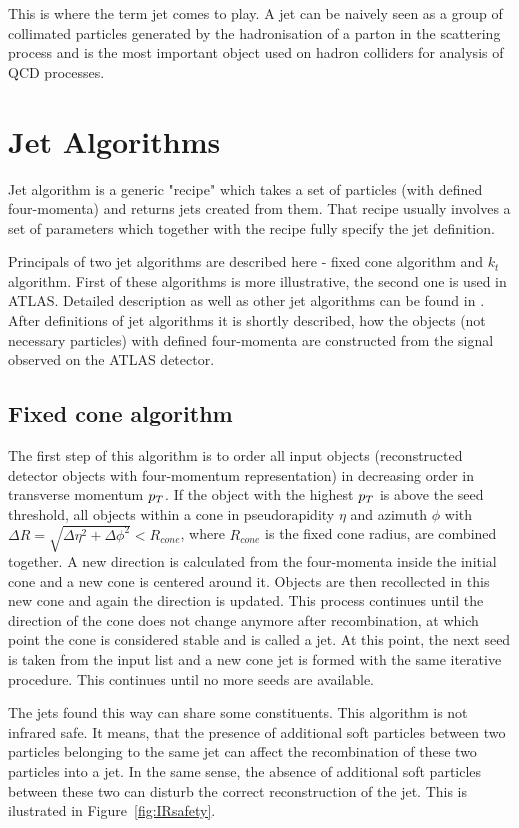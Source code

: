 This is where the term jet comes to play. A jet can be naively seen as a group
of collimated particles generated by the hadronisation of a parton in the
scattering process and is the most important object used on hadron colliders for
analysis of QCD processes.

\section{Jet Algorithms}

Jet algorithm is a generic "recipe" which takes a set of particles (with defined
four-momenta) and returns jets created from them. That recipe usually involves a
set of parameters which together with the recipe fully specify the jet
definition. 

Principals of two jet algorithms are described here - fixed cone algorithm and
$k_t$ algorithm. First of these algorithms is more illustrative, the second one
is used in ATLAS. Detailed description as well as other jet algorithms can be
found in \cite{ATLASmain}. After definitions of jet algorithms it is shortly
described, how the objects (not necessary particles) with defined four-momenta
are constructed from the signal observed on the ATLAS detector. 

\subsection{Fixed cone algorithm}

The first step of this algorithm is to order all input objects (reconstructed
detector objects with four-momentum representation) in decreasing order in
transverse momentum $p_T$. If the object with the highest $p_T$ is above the
seed threshold, all objects within a cone in pseudorapidity $\eta$ and azimuth
$\phi$ with $\Delta R = \sqrt{\Delta \eta^2 + \Delta \phi^2} < R_{cone}$, where
$R_{cone}$ is the fixed cone radius, are combined together. A new direction is
calculated from the four-momenta inside the initial cone and a new cone is
centered around it. Objects are then recollected in this new cone and again the
direction is updated. This process continues until the direction of the cone
does not change anymore after recombination, at which point the cone is
considered stable and is called a jet. At this point, the next seed is taken
from the input list and a new cone jet is formed with the same iterative
procedure. This continues until no more seeds are available. 

The jets found this way can share some constituents. This algorithm is not
infrared safe. It means, that the presence of additional soft particles between
two particles belonging to the same jet can affect the recombination of these
two particles into a jet. In the same sense, the absence of additional soft
particles between these two can disturb the correct reconstruction of the jet.
This is ilustrated in Figure~\ref{fig:IRsafety}.

